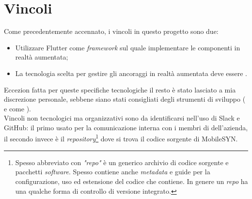 \section{Vincoli}
Come precedentemente accennato, i vincoli in questo progetto sono due: 
\begin{itemize}
    \item Utilizzare Flutter come \textit{framework} sul quale implementare le componenti in realtà aumentata;
    \item La tecnologia scelta per gestire gli ancoraggi in realtà aumentata deve essere \asa{}.
\end{itemize}
Eccezion fatta per queste specifiche tecnologiche il resto è stato lasciato a mia discrezione personale, sebbene siano stati consigliati degli strumenti di sviluppo (\vsc{} e \astudio{} come \ide{}). \\
Vincoli non tecnologici ma organizzativi sono da identificarsi nell'uso di Slack e GitHub: il primo usato per la comunicazione interna con i membri di dell'azienda, il secondo invece è il \textit{repository}\footnote{Spesso abbreviato con \textit{"repo"} è un generico archivio di codice sorgente e pacchetti \textit{software}. Spesso contiene anche \textit{metadata} e guide per la configurazione, uso ed estensione del codice che contiene. In genere un \textit{repo} ha una qualche forma di controllo di versione integrato.} dove si trova il codice sorgente di MobileSYN.

